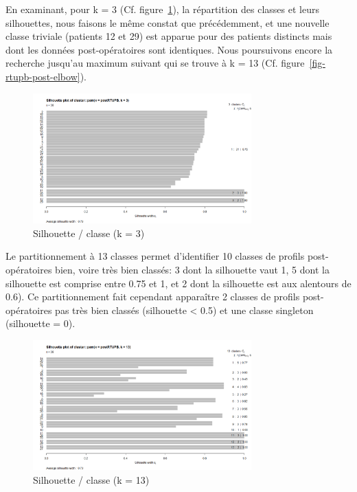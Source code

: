 En examinant, pour k = 3 (Cf. figure~\ref{fig-rtupb-post-pam-k3}), la répartition des classes et leurs silhouettes, nous faisons le même constat que précédemment, et une nouvelle classe triviale (patients 12 et 29) est apparue pour des patients distincts
mais dont les données post-opératoires sont identiques. Nous poursuivons encore la recherche jusqu'au maximum suivant qui se trouve à k = 13 (Cf. figure~\ref{fig-rtupb-post-elbow}).

\begin{figure}[H]
\centering
\includegraphics[width=0.75\textwidth]{../Fig/RTUPB/rtupb-sil-k3-post.png}
\caption[]{Silhouette / classe (k = 3)}
\label{fig-rtupb-post-pam-k3}
\end{figure}

Le partitionnement à 13 classes permet d'identifier 10 classes de profils post-opératoires bien, voire très bien classés: 3 dont la silhouette vaut 1, 5 dont la silhouette est comprise entre 0.75 et 1, et 2 dont la silhouette
est aux alentours de 0.6). Ce partitionnement fait cependant apparaître 2 classes de profils post-opératoires pas très bien classés (silhouette < 0.5) et une classe singleton (silhouette = 0). 

\begin{figure}[H]
\centering
\includegraphics[width=0.75\textwidth]{../Fig/RTUPB/rtupb-sil-k13-post.png}
\caption{Silhouette / classe (k = 13)}
\label{fig-rtupb-post-pam-k13}
\end{figure}

